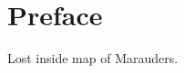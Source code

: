\documentclass[../Main.tex]{subfiles}
\begin{document}
\chapter*{Preface}
Lost inside map of Marauders.
\end{document}
